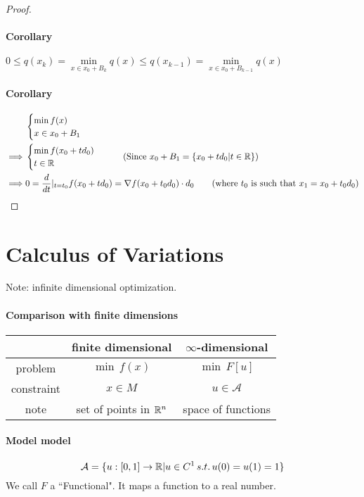 \documentclass[11pt]{article}
\begin{document}
\begin{proof}
\paragraph{Corollary} $0 \leq q(x_{k}) = \underset{x \in x_0 + B_k}{\min} q(x) \leq q(x_{k-1}) = \underset{x \in x_0 + B_{k-1}}{\min} q(x)$
\paragraph{Corollary}
\begin{align}
&\begin{cases}
	\min f(x) \\
	x \in x_0 + B_1
\end{cases} \\
\implies &\begin{cases}
	\min f(x_0 + td_0) \\
	t \in \real
\end{cases}\tag{Since $x_0 + B_1 = \{x_0 + td_0 | t \in \real \}$} \\
\implies &0 = \frac{d}{dt}|_{t=t_0} f(x_0 + td_0) = \nabla f(x_0 + t_0d_0) \cdot d_0 \tag{where $t_0$ is such that $x_1 = x_0 + t_0 d_0$}
\end{align}
\end{proof}

\section{Calculus of Variations}
Note: infinite dimensional optimization.
\paragraph{Comparison with finite dimensions}
\begin{center}
\begin{tabular}{ |c|c|c| } 
 \hline
 & finite dimensional & $\infty$-dimensional \\
 \hline
 problem & $\min \, f(x)$ & $\min \, F[u]$ \\
 \hline
 constraint & $x \in M$ & $u \in \mathcal{A}$ \\ 
 \hline
 note & set of points in $\mathbb{R}^n$ & space of functions \\
 \hline
\end{tabular}
\end{center}
\paragraph{Model model}
$$\mathcal{A} =  \{ u: [0,1] \rightarrow \mathbb{R} | u \in C^1 \, s.t. \, u(0) = u(1) = 1\}$$
 We call $F$ a ``Functional". It maps a function to a real number.
\end{document}
